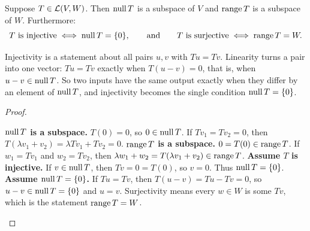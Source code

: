 \documentclass[10pt]{scrartcl}
\begin{document}
\begin{proposition*}
  Suppose $T\in\mathcal L(V,W)$. Then $\operatorname{null} T$ is a subspace of $V$ and $\operatorname{range} T$ is a subspace of $W$. Furthermore:
  \[
    T\text{ is injective} \iff \operatorname{null} T = \{0\}, \qquad\text{and}\qquad T\text{ is surjective} \iff \operatorname{range} T = W.
  \]
\end{proposition*}
\begin{ideabox}
  Injectivity is a statement about all pairs $u,v$ with $Tu=Tv$. Linearity turns a pair into one vector: $Tu=Tv$ exactly when $T(u-v)=0$, that is, when $u-v\in\operatorname{null} T$. So two inputs have the same output exactly when they differ by an element of $\operatorname{null} T$, and injectivity becomes the single condition $\operatorname{null} T=\{0\}$.
\end{ideabox}
\begin{proof}
  \begin{steps}
    \ii \textbf{$\operatorname{null} T$ is a subspace.} $T(0)=0$, so $0\in\operatorname{null} T$. If $Tv_1=Tv_2=0$, then $T(\lambda v_1+v_2)=\lambda Tv_1+Tv_2=0$.
    \ii \textbf{$\operatorname{range} T$ is a subspace.} $0=T(0)\in\operatorname{range} T$. If $w_1=Tv_1$ and $w_2=Tv_2$, then $\lambda w_1+w_2=T(\lambda v_1+v_2)\in\operatorname{range} T$.
    \ii \textbf{Assume $T$ is injective.} If $v\in\operatorname{null} T$, then $Tv=0=T(0)$, so $v=0$. Thus $\operatorname{null} T=\{0\}$.
    \ii \textbf{Assume $\operatorname{null} T=\{0\}$.} If $Tu=Tv$, then $T(u-v)=Tu-Tv=0$, so $u-v\in\operatorname{null} T=\{0\}$ and $u=v$.
    \ii Surjectivity means every $w\in W$ is some $Tv$, which is the statement $\operatorname{range} T=W$.
  \end{steps}
\end{proof}
\end{document}

